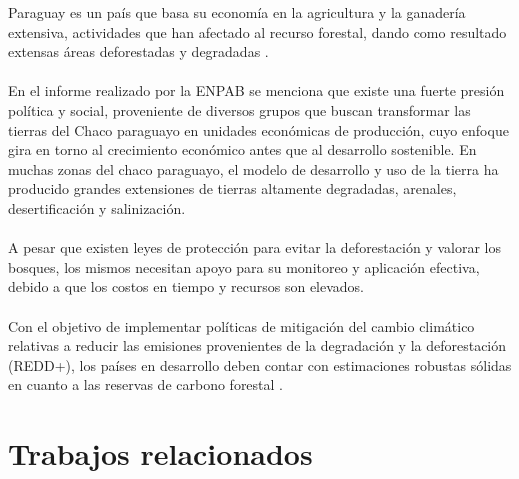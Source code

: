 Paraguay es un pa\'is que basa su econom\'ia en la agricultura y la ganader\'ia extensiva, actividades que han afectado al recurso forestal, dando como resultado extensas \'areas deforestadas y degradadas \cite{BAAPA2013}.\\~\\
	En el informe realizado por la ENPAB \cite{basualdo2003estrategia} se menciona que existe una fuerte presi\'on pol\'itica y social, proveniente de diversos grupos que buscan transformar las tierras del Chaco paraguayo en unidades econ\'omicas de producci\'on, cuyo enfoque gira en torno al crecimiento econ\'omico antes que al desarrollo sostenible. 
	En muchas zonas del chaco paraguayo, el modelo de desarrollo y uso de la tierra ha producido grandes extensiones de tierras altamente degradadas, arenales, desertificaci\'on y salinizaci\'on.\\~\\	
	A pesar que existen leyes de protecci\'on para evitar la deforestaci\'on y valorar los bosques, los mismos necesitan apoyo para su monitoreo y aplicaci\'on efectiva, debido a que los costos en tiempo y recursos son elevados.\\~\\
	Con el objetivo de implementar pol\'iticas de mitigaci\'on del cambio clim\'atico relativas a reducir las emisiones provenientes de la degradaci\'on y la deforestaci\'on (REDD+), los pa\'ises en desarrollo deben contar con estimaciones robustas s\'olidas en cuanto a las reservas de carbono forestal \cite{BAAPA2013}.

\section{Trabajos relacionados}\label{sec:antecedente}

